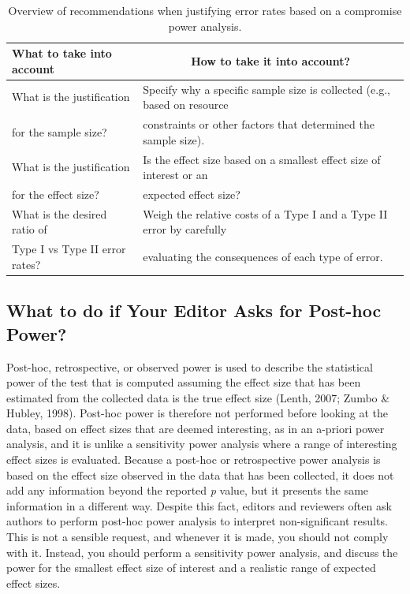 \documentclass[
  english,
  ,jou,floatsintext]{apa6}
\begin{document}
\begin{table}[tbp]

\begin{center}
\begin{threeparttable}

\caption{\label{tab:table-compromise-just}Overview of recommendations when justifying error rates based on a compromise power analysis.}

\begin{tabular}{ll}
\toprule
What to take into account & \multicolumn{1}{c}{How to take it into account?}\\
\midrule
What is the justification & Specify why a specific sample size is collected (e.g., based on resource\\
for the sample size? & constraints or other factors that determined the sample size).\\ \midrule
What is the justification & Is the effect size based on a smallest effect size of interest or an\\
for the effect size? & expected effect size?\\ \midrule
What is the desired ratio of & Weigh the relative costs of a Type I and a Type II error by carefully\\
Type I vs Type II error rates? & evaluating the consequences of each type of error.\\ \midrule
\bottomrule
\end{tabular}

\end{threeparttable}
\end{center}

\end{table}

\hypertarget{what-to-do-if-your-editor-asks-for-post-hoc-power}{%
\subsection{What to do if Your Editor Asks for Post-hoc Power?}\label{what-to-do-if-your-editor-asks-for-post-hoc-power}}

Post-hoc, retrospective, or observed power is used to describe the statistical power of the test that is computed assuming the effect size that has been estimated from the collected data is the true effect size (Lenth, 2007; Zumbo \& Hubley, 1998). Post-hoc power is therefore not performed before looking at the data, based on effect sizes that are deemed interesting, as in an a-priori power analysis, and it is unlike a sensitivity power analysis where a range of interesting effect sizes is evaluated. Because a post-hoc or retrospective power analysis is based on the effect size observed in the data that has been collected, it does not add any information beyond the reported \emph{p} value, but it presents the same information in a different way. Despite this fact, editors and reviewers often ask authors to perform post-hoc power analysis to interpret non-significant results. This is not a sensible request, and whenever it is made, you should not comply with it. Instead, you should perform a sensitivity power analysis, and discuss the power for the smallest effect size of interest and a realistic range of expected effect sizes.
\end{document}

